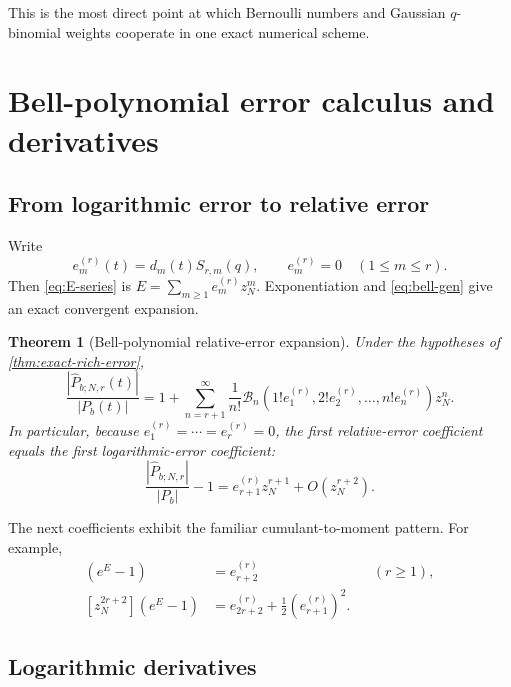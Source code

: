 \documentclass[11pt]{article}
\newtheorem{theorem}{Theorem}[section]
\theoremstyle{definition}
\theoremstyle{remark}
\begin{document}
This is the most direct point at which Bernoulli numbers and Gaussian $q$-binomial weights cooperate in one exact numerical scheme.

\section{Bell-polynomial error calculus and derivatives}
\label{sec:bell}

\subsection{From logarithmic error to relative error}

Write
\begin{equation}
e_m^{(r)}(t)=d_m(t)S_{r,m}(q),
\qquad e_m^{(r)}=0\quad(1\le m\le r).
\label{eq:em}
\end{equation}
Then \cref{eq:E-series} is $E=\sum_{m\ge1}e_m^{(r)}z_N^m$. Exponentiation and \cref{eq:bell-gen} give an exact convergent expansion.

\begin{theorem}[Bell-polynomial relative-error expansion]
\label{thm:bell-relative}
Under the hypotheses of \cref{thm:exact-rich-error},
\begin{equation}
\frac{|\widehat P_{b;N,r}(t)|}{|P_b(t)|}
=1+\sum_{n=r+1}^{\infty}
\frac{1}{n!}
\mathcal B_n\!\left(1!e_1^{(r)},2!e_2^{(r)},\ldots,n!e_n^{(r)}\right)z_N^n.
\label{eq:bell-relative}
\end{equation}
In particular, because $e_1^{(r)}=\cdots=e_r^{(r)}=0$, the first relative-error coefficient equals the first logarithmic-error coefficient:
\begin{equation}
\frac{|\widehat P_{b;N,r}|}{|P_b|}-1
=e_{r+1}^{(r)}z_N^{r+1}+O(z_N^{r+2}).
\label{eq:first-relative}
\end{equation}
\end{theorem}

The next coefficients exhibit the familiar cumulant-to-moment pattern. For example,
\begin{align*}
[z_N^{r+2}]\left(e^E-1\right)&=e_{r+2}^{(r)}
&& (r\ge1),\\
[z_N^{2r+2}]\left(e^E-1\right)&=e_{2r+2}^{(r)}+\frac12(e_{r+1}^{(r)})^2.
\end{align*}

\subsection{Logarithmic derivatives}
\end{document}

